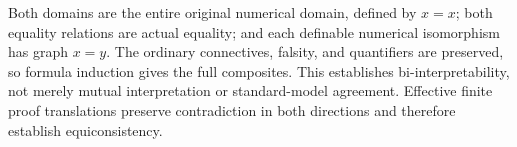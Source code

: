 Both domains are the entire original numerical domain, defined by $x=x$;
both equality relations are actual equality; and each definable numerical
isomorphism has graph $x=y$. The ordinary connectives, falsity, and
quantifiers are preserved, so formula induction gives the full composites.
This establishes bi-interpretability, not merely mutual interpretation or
standard-model agreement. Effective finite proof translations preserve
contradiction in both directions and therefore establish equiconsistency.

